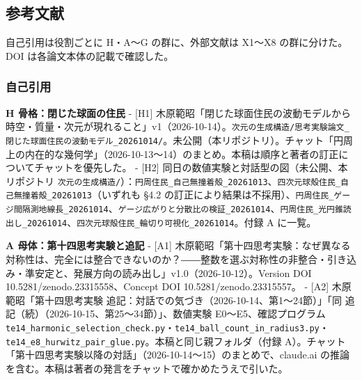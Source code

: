 \documentclass[
  a4paper,
]{ltjsarticle}
\begin{document}
\subsection{参考文献}\label{ux53c2ux8003ux6587ux732e}

自己引用は役割ごとに H・A〜G の群に、外部文献は X1〜X8 の群に分けた。DOI
は各論文本体の記載で確認した。

\subsubsection{自己引用}\label{ux81eaux5df1ux5f15ux7528}

\textbf{H 骨格：閉じた球面の住民} - {[}H1{]}
木原範昭「閉じた球面住民の波動モデルから時空・質量・次元が現れること」v1（2026-10-14）。\texttt{次元の生成構造/\allowbreak{}思考実験論文\_\allowbreak{}閉じた球面住民の波動モデル\_\allowbreak{}20261014/\allowbreak{}}。未公開（本リポジトリ）。チャット「円周上の内在的な幾何学」（2026-10-13〜14）のまとめ。本稿は順序と著者の訂正についてチャットを優先した。
- {[}H2{]} 同日の数値実験と対話型の図（未公開、本リポジトリ
\texttt{次元の生成構造/\allowbreak{}}）：\texttt{円周住民\_\allowbreak{}自己無撞着殻\_\allowbreak{}20261013}、\texttt{四次元球殻住民\_\allowbreak{}自己無撞着殻\_\allowbreak{}20261013}（いずれも
§4.2
の訂正により結果は不採用）、\texttt{円周住民\_\allowbreak{}ゲージ間隔測地線長\_\allowbreak{}20261014}、\texttt{ゲージ広がりと分散比の検証\_\allowbreak{}20261014}、\texttt{円周住民\_\allowbreak{}光円錐読出し\_\allowbreak{}20261014}、\texttt{四次元球殻住民\_\allowbreak{}輪切り可視化\_\allowbreak{}20261014}。付録
A に一覧。

\textbf{A 母体：第十四思考実験と追記} - {[}A1{]}
木原範昭「第十四思考実験：なぜ異なる対称性は、完全には整合できないのか？――整数を選ぶ対称性の非整合・引き込み・準安定と、発展方向の読み出し」v1.0（2026-10-12）。Version
DOI 10.5281/zenodo.23315558、Concept DOI 10.5281/zenodo.23315557。 -
{[}A2{]} 木原範昭「第十四思考実験
追記：対話での気づき（2026-10-14、第1〜24節）」「同
追記（続）（2026-10-15、第25〜34節）」、数値実験 E0〜E5、確認プログラム
\texttt{te14\_\allowbreak{}harmonic\_\allowbreak{}selection\_\allowbreak{}check.py}・\texttt{te14\_\allowbreak{}ball\_\allowbreak{}count\_\allowbreak{}in\_\allowbreak{}radius3.py}・\texttt{te14\_\allowbreak{}e8\_\allowbreak{}hurwitz\_\allowbreak{}pair\_\allowbreak{}glue.py}。本稿と同じ親フォルダ（付録
A）。チャット「第十四思考実験以降の対話」（2026-10-14〜15）のまとめで、claude.ai
の推論を含む。本稿は著者の発言をチャットで確かめたうえで引いた。
\end{document}
